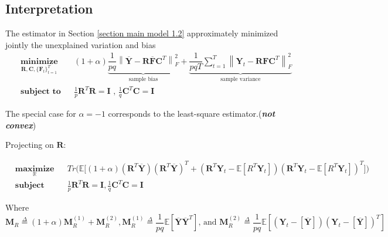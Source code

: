 \documentclass{article}[12pt]
\begin{document}
\subsection{Interpretation}

\noindent The estimator in Section \ref{section main model 1.2} approximately minimized jointly the unexplained variation and bias
\begin{equation}
    \begin{aligned}
    & \underset{\mathbf{R},\mathbf{C},\{\mathbf{F}_t\}_{t=1}^T}{\textbf{minimize}}
    & & (1+\alpha)\underbrace{\dfrac{1}{pq}\left\lVert \mathbf{\overline{Y}} - \mathbf{R}\mathbf{\overline{F}}\mathbf{C}^T\right\rVert_{F}^2}_\text{sample bias} + \underbrace{\dfrac{1}{pqT}\sum\limits_{t=1}^{T}\left\lVert \mathbf{Y}_t - \mathbf{R}\mathbf{F}\mathbf{C}^T\right\rVert_{F}^2}_\text{sample variance}\\
    & \textbf{subject to}
    & & \frac{1}{p}\mathbf{R}^T\mathbf{R} = \mathbf{I} \text{ , } \frac{1}{q}\mathbf{C}^T\mathbf{C} = \mathbf{I}
    \end{aligned}
\end{equation}

\noindent The special case for $\alpha = -1$ corresponds to the least-square estimator.(\textbf{\textit{not convex}})

\noindent Projecting on $\mathbf{R}$:

\begin{equation}
    \begin{aligned}
    & \underset{\mathbb{R}}{\textbf{maximize}}
    & & Tr\Bigg(\mathbb{E}\Bigg[(1+\alpha)(\mathbf{R}^T\mathbf{\overline{Y}})(\mathbf{R}^T\mathbf{\overline{Y}})^T+(\mathbf{R}^T\mathbf{Y}_t-\mathbb{E}\left[{R}^T\mathbf{Y}_t\right])(\mathbf{R}^T\mathbf{Y}_t-\mathbb{E}\left[{R}^T\mathbf{Y}_t\right])^T\Bigg]\Bigg)\\
    & \textbf{subject to}
    & & \frac{1}{p}\mathbf{R}^T\mathbf{R} = \mathbf{I}, \frac{1}{q}\mathbf{C}^T\mathbf{C} = \mathbf{I}
    \end{aligned}
\end{equation}

\noindent Where
$\mathbf{M}_R \overset{\Delta}{=} (1+\alpha)\mathbf{M}_R^{(1)}+\mathbf{M}_R^{(2)}, \mathbf{M}_R^{(1)} \overset{\Delta}{=} \dfrac{1}{pq}\mathbb{E}\left[\mathbf{\overline{Y}}\mathbf{\overline{Y}}^T\right] \text{, and } \mathbf{M}_R^{(2)} \overset{\Delta}{=} \dfrac{1}{pq}\mathbb{E}\left[\left(\mathbf{Y}_t-\mathbb{\left[\mathbf{\overline{Y}}\right]}\right)\left(\mathbf{Y}_t-\mathbb{\left[\mathbf{\overline{Y}}\right]}\right)^T\right]$
\end{document}
